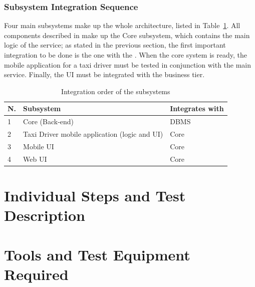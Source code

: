 \documentclass[a4paper, 12pt]{article}
\begin{document}
\subsubsection{Subsystem Integration Sequence}
\label{ssub:subsystem_integration_sequence}

Four main subsystems make up the whole architecture, listed in Table~\ref{tab:subsystem-integration}. All components described in \cite{bib:dd} make up the Core subsystem, which contains the main logic of the service; as stated in the previous section, the first important integration to be done is the one with the . When the core system is ready, the mobile application for a taxi driver must be tested in conjunction with the main service. Finally, the UI must be integrated with the business tier.

\begin{table}
    \centering
    \begin{tabular}[h!bp]{| l | l | l |}
        \hline
        \textbf{N.} & \textbf{Subsystem} & \textbf{Integrates with} \\
        \hline
        1 & Core (Back-end) & DBMS \\
        2 & Taxi Driver mobile application (logic and UI) & Core \\
        3 & Mobile UI & Core \\
        4 & Web UI & Core \\
        \hline
    \end{tabular}
    \caption{Integration order of the subsystems}
    \label{tab:subsystem-integration}
\end{table}

\newpage
\section{Individual Steps and Test Description}
\label{sub:individual_steps_and_test_description}



\newpage
\section{Tools and Test Equipment Required}
\label{sub:tools_and_test_equipment_required}
\end{document}
